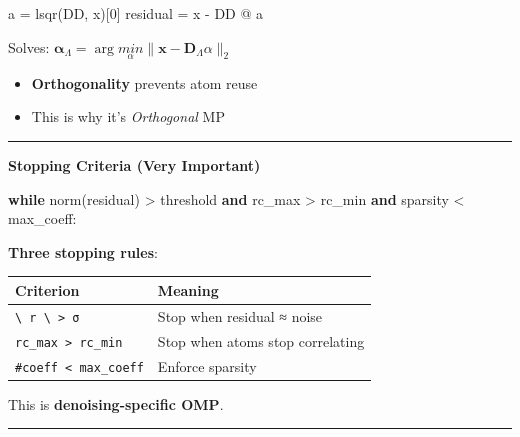 \documentclass[11pt]{article}
\providecommand{\tightlist}{%
      \setlength{\itemsep}{0pt}\setlength{\parskip}{0pt}}
\newenvironment{Shaded}{}{}
\newcommand{\KeywordTok}[1]{\textcolor[rgb]{0.00,0.44,0.13}{\textbf{{#1}}}}
\newcommand{\DecValTok}[1]{\textcolor[rgb]{0.25,0.63,0.44}{{#1}}}
\newcommand{\NormalTok}[1]{{#1}}
\newcommand{\ControlFlowTok}[1]{\textcolor[rgb]{0.00,0.44,0.13}{\textbf{{#1}}}}
\newcommand{\OperatorTok}[1]{\textcolor[rgb]{0.40,0.40,0.40}{{#1}}}
\begin{document}
\begin{Shaded}
\begin{Highlighting}[]
\NormalTok{a }\OperatorTok{=}\NormalTok{ lsqr(DD, x)[}\DecValTok{0}\NormalTok{]}
\NormalTok{residual }\OperatorTok{=}\NormalTok{ x }\OperatorTok{{-}}\NormalTok{ DD }\OperatorTok{@}\NormalTok{ a}
\end{Highlighting}
\end{Shaded}

Solves:
\(\boldsymbol{\alpha}_\Lambda = \arg \underset{\alpha}{min} \|\mathbf{x} - \mathbf{D}_\Lambda \alpha\|_2\)

\begin{itemize}
\tightlist
\item
  \textbf{Orthogonality} prevents atom reuse
\item
  This is why it's \emph{Orthogonal} MP
\end{itemize}

\begin{center}\rule{0.5\linewidth}{0.5pt}\end{center}

\textbf{Stopping Criteria (Very Important)}

\begin{Shaded}
\begin{Highlighting}[]
\ControlFlowTok{while}\NormalTok{ norm(residual) }\OperatorTok{\textgreater{}}\NormalTok{ threshold}
      \KeywordTok{and}\NormalTok{ rc\_max }\OperatorTok{\textgreater{}}\NormalTok{ rc\_min}
      \KeywordTok{and}\NormalTok{ sparsity }\OperatorTok{\textless{}}\NormalTok{ max\_coeff:}
\end{Highlighting}
\end{Shaded}

\textbf{Three stopping rules}:

\begin{longtable}[]{@{}ll@{}}
\toprule
Criterion & Meaning \\
\midrule
\endhead
\texttt{\textbackslash{}\textbar{}\ r\ \textbackslash{}\textbar{}\ \textgreater{}\ σ}
& Stop when residual ≈ noise \\
\texttt{rc\_max\ \textgreater{}\ rc\_min} & Stop when atoms stop
correlating \\
\texttt{\#coeff\ \textless{}\ max\_coeff} & Enforce sparsity \\
\bottomrule
\end{longtable}

This is \textbf{denoising-specific OMP}.

\begin{center}\rule{0.5\linewidth}{0.5pt}\end{center}
\end{document}
